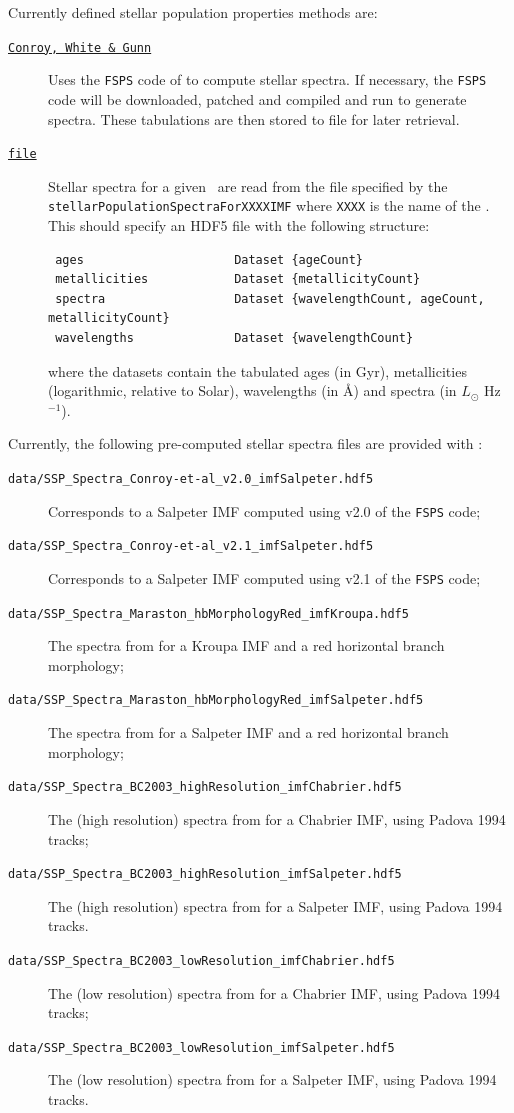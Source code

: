 Currently defined stellar population properties methods are:
\begin{description}
 \item [\hyperlink{stellar_populations.spectra.Conroy_et_al.F90:stellar_population_spectra_conroy}{{\tt Conroy, White \& Gunn}}] Uses the {\tt FSPS} code of \cite{conroy_propagation_2009} to compute stellar spectra. If necessary, the {\tt FSPS} code will be downloaded, patched and compiled and run to generate spectra. These tabulations are then stored to file for later retrieval.
 \item [\hyperlink{stellar_populations.spectra.file.F90:stellar_population_spectra_file}{{\tt file}}] Stellar spectra for a given \IMF\ are read from the file specified by the {\tt stellarPopulationSpectraForXXXXIMF} where {\tt XXXX} is the name of the \IMF. This should specify an HDF5 file with the following structure:
\begin{verbatim}
 ages                     Dataset {ageCount}
 metallicities            Dataset {metallicityCount}
 spectra                  Dataset {wavelengthCount, ageCount, metallicityCount}
 wavelengths              Dataset {wavelengthCount}
\end{verbatim}
where the datasets contain the tabulated ages (in Gyr), metallicities (logarithmic, relative to Solar), wavelengths (in \AA) and spectra (in $L_\odot$ Hz$^{-1}$).
\end{description}
Currently, the following pre-computed stellar spectra files are provided with \glc:
\begin{description}
 \item [{\tt data/SSP\_Spectra\_Conroy-et-al\_v2.0\_imfSalpeter.hdf5}] Corresponds to a Salpeter IMF computed using v2.0 of the {\tt FSPS} code;
 \item [{\tt data/SSP\_Spectra\_Conroy-et-al\_v2.1\_imfSalpeter.hdf5}]  Corresponds to a Salpeter IMF computed using v2.1 of the {\tt FSPS} code;
 \item [{\tt data/SSP\_Spectra\_Maraston\_hbMorphologyRed\_imfKroupa.hdf5}] The spectra from \cite{maraston_evolutionary_2005} for a Kroupa IMF and a red horizontal branch morphology;
 \item [{\tt data/SSP\_Spectra\_Maraston\_hbMorphologyRed\_imfSalpeter.hdf5}] The spectra from \cite{maraston_evolutionary_2005} for a Salpeter IMF and a red horizontal branch morphology; 
 \item [{\tt data/SSP\_Spectra\_BC2003\_highResolution\_imfChabrier.hdf5}] The (high resolution) spectra from \cite{bruzual_stellar_2003} for a Chabrier IMF, using Padova 1994 tracks;
 \item [{\tt data/SSP\_Spectra\_BC2003\_highResolution\_imfSalpeter.hdf5}] The (high resolution) spectra from \cite{bruzual_stellar_2003} for a Salpeter IMF, using Padova 1994 tracks.
 \item [{\tt data/SSP\_Spectra\_BC2003\_lowResolution\_imfChabrier.hdf5}] The (low resolution) spectra from \cite{bruzual_stellar_2003} for a Chabrier IMF, using Padova 1994 tracks;
 \item [{\tt data/SSP\_Spectra\_BC2003\_lowResolution\_imfSalpeter.hdf5}] The (low resolution) spectra from \cite{bruzual_stellar_2003} for a Salpeter IMF, using Padova 1994 tracks.
\end{description}
